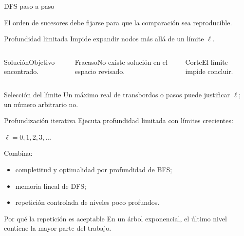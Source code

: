 \documentclass[aspectratio=169,11pt]{beamer}
\begin{document}
\begin{frame}{DFS paso a paso}
  \centering
  \vfill
  El orden de sucesores debe fijarse para que la comparación sea reproducible.
\end{frame}

\begin{frame}{Profundidad limitada}
  Impide expandir nodos más allá de un límite $\ell$.
  \begin{columns}[T]
    \begin{block}{Solución}Objetivo encontrado.\end{block}
    \begin{block}{Fracaso}No existe solución en el espacio revisado.\end{block}
    \begin{block}{Corte}El límite impide concluir.\end{block}
  \end{columns}
  \vfill
  \begin{alertblock}{Selección del límite}
    Un máximo real de transbordos o pasos puede justificar $\ell$; un número arbitrario no.
  \end{alertblock}
\end{frame}

\begin{frame}{Profundización iterativa}
  Ejecuta profundidad limitada con límites crecientes:
  \begin{center}
    \Large $\ell=0,1,2,3,\ldots$
  \end{center}
  Combina:
  \begin{itemize}
    \item completitud y optimalidad por profundidad de BFS;
    \item memoria lineal de DFS;
    \item repetición controlada de niveles poco profundos.
  \end{itemize}
  \begin{block}{Por qué la repetición es aceptable}
    En un árbol exponencial, el último nivel contiene la mayor parte del trabajo.
  \end{block}
\end{frame}
\end{document}
